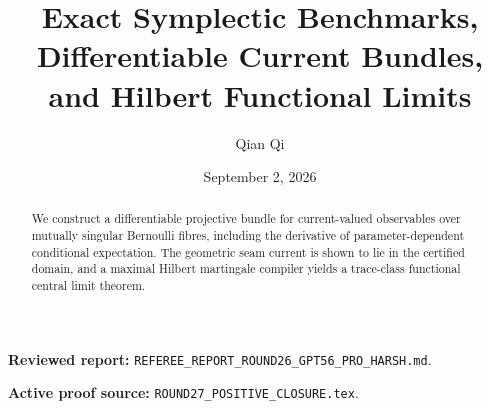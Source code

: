 \documentclass[11pt,reqno]{amsart}
\title[A1 Round 27 revision]{Exact Symplectic Benchmarks, Differentiable Current Bundles, and Hilbert Functional Limits}
\author{Qian Qi}
\date{September 2, 2026}
\begin{document}
\begin{abstract}We construct a differentiable projective bundle for current-valued observables over mutually singular Bernoulli fibres, including the derivative of parameter-dependent conditional expectation. The geometric seam current is shown to lie in the certified domain, and a maximal Hilbert martingale compiler yields a trace-class functional central limit theorem.\end{abstract}
\maketitle
\noindent\textbf{Reviewed report:} \texttt{REFEREE\_REPORT\_ROUND26\_GPT56\_PRO\_HARSH.md}.\par
\noindent\textbf{Active proof source:} \texttt{ROUND27\_POSITIVE\_CLOSURE.tex}.\par

\end{document}
